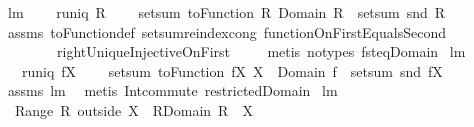 \begin{isabellebody}
\endisatagproof
{\isafoldproof}%
%
\isadelimproof
\isanewline
%
\endisadelimproof
\isanewline
{}\isamarkupfalse%
\ lm{}{}{}{\isacharcolon}\ \isanewline
\ \ \ {\isachardoublequoteopen}runiq\ R{\isachardoublequoteclose}\ \isanewline
\ \ \ {\isachardoublequoteopen}setsum\ {\isacharparenleft}toFunction\ R{\isacharparenright}\ {\isacharparenleft}Domain\ R{\isacharparenright}\ {\isacharequal}\ setsum\ snd\ R{\isachardoublequoteclose}\ \isanewline
%
\isadelimproof
\ \ %
\endisadelimproof
%
\isatagproof
{}\isamarkupfalse%
\ assms\ toFunction{\isacharunderscore}def\ setsum{\isachardot}reindex{\isacharunderscore}cong\ functionOnFirstEqualsSecond\isanewline
\ \ \ \ \ \ \ \ rightUniqueInjectiveOnFirst\ \isanewline
\ \ \isamarkupfalse%
\ {\isacharparenleft}metis\ {\isacharparenleft}no{\isacharunderscore}types{\isacharparenright}\ fst{\isacharunderscore}eq{\isacharunderscore}Domain{\isacharparenright}%
\endisatagproof
{\isafoldproof}%
%
\isadelimproof
\isanewline
%
\endisadelimproof
\isanewline
{}\isamarkupfalse%
\ lm{}{}{}{\isacharcolon}\ \isanewline
\ \ \ {\isachardoublequoteopen}runiq\ {\isacharparenleft}f{\isacharbar}{\isacharbar}X{\isacharparenright}{\isachardoublequoteclose}\ \isanewline
\ \ \ {\isachardoublequoteopen}setsum\ {\isacharparenleft}toFunction\ {\isacharparenleft}f{\isacharbar}{\isacharbar}X{\isacharparenright}{\isacharparenright}\ {\isacharparenleft}X\ {\isasyminter}\ Domain\ f{\isacharparenright}\ {\isacharequal}\ setsum\ snd\ {\isacharparenleft}f{\isacharbar}{\isacharbar}X{\isacharparenright}{\isachardoublequoteclose}\ \isanewline
%
\isadelimproof
\ \ %
\endisadelimproof
%
\isatagproof
{}\isamarkupfalse%
\ assms\ lm{}{}{}\ \isamarkupfalse%
\ {\isacharparenleft}metis\ Int{\isacharunderscore}commute\ restrictedDomain{\isacharparenright}%
\endisatagproof
{\isafoldproof}%
%
\isadelimproof
\isanewline
%
\endisadelimproof
\isanewline
{}\isamarkupfalse%
\ lm{}{}{}{\isacharcolon}\ \isanewline
\ \ {\isachardoublequoteopen}Range\ {\isacharparenleft}R\ outside\ X{\isacharparenright}\ {\isacharequal}\ R{\isacharbackquote}{\isacharbackquote}{\isacharparenleft}{\isacharparenleft}Domain\ R{\isacharparenright}\ {\isacharminus}\ X{\isacharparenright}{\isachardoublequoteclose}\ \isanewline
%
\isadelimproof
\ \ %
\endisadelimproof
%
\isatagproof

\end{isabellebody}
